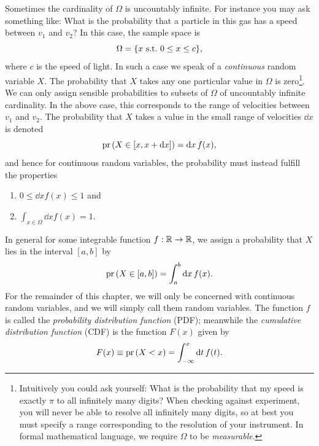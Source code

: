 Sometimes the cardinality of $\Omega$ is uncountably infinite. For instance you
may ask something like: What is the probability that a particle in this gas has
a speed between $v_1$ and $v_2$? In this case, the sample space is
\begin{equation}
  \Omega=\{x~\text{s.t.}~0\leq x\leq c\},
\end{equation}
where $c$ is the speed of light.
In such a case we speak of a {\it continuous} random variable $X$.
The probability that $X$ takes any one particular value in $\Omega$ is
zero\footnote{Intuitively you could ask yourself: What is the probability that
my speed is exactly $\pi$ to all infinitely many digits? When checking against
experiment, you will never be able to resolve all infinitely many digits, so at
best you must specify a range corresponding to the resolution of your
instrument. In formal mathematical language, we require $\Omega$ to be
{\it measurable}.}.
We can only assign
sensible probabilities to subsets of $\Omega$ of uncountably infinite
cardinality. In the above
case, this corresponds to the range of velocities between $v_1$ and $v_2$.
The probability that $X$ takes a value in the small range of velocities $\dd x$
is denoted
\begin{equation}
   \operatorname{pr}\left(X\in[x,x+\dd x]\right)=\dd{x}f(x),
\end{equation}
and hence for continuous random variables, the probability must instead
fulfill the properties
\begin{enumerate}
  \item  $0\leq\dd{x}f(x)\leq 1$ and
  \item $\int_{x\in\Omega}\dd{x}f(x)=1$.
\end{enumerate}
In general for some integrable function 
$f:\mathbb{R}\to\mathbb{R}$, we assign a 
probability that $X$ lies in the interval $[a,b]$ by
\begin{equation}
  \label{eq:cpr}
  \operatorname{pr}\left(X\in[a,b]\right)=\int_a^b\dd{x}f(x).
\end{equation}
For the remainder of this chapter, we will
only be concerned with continuous random variables, and we will simply call
them random variables.
The function $f$ is called the {\it probability distribution function} 
(PDF); meanwhile the {\it cumulative distribution function} 
(CDF) is the function $F(x)$ given by
\begin{equation}
  F(x)\equiv \operatorname{pr}\left(X<x\right)=\int_{-\infty}^x\dd{t}f(t).
\end{equation}
